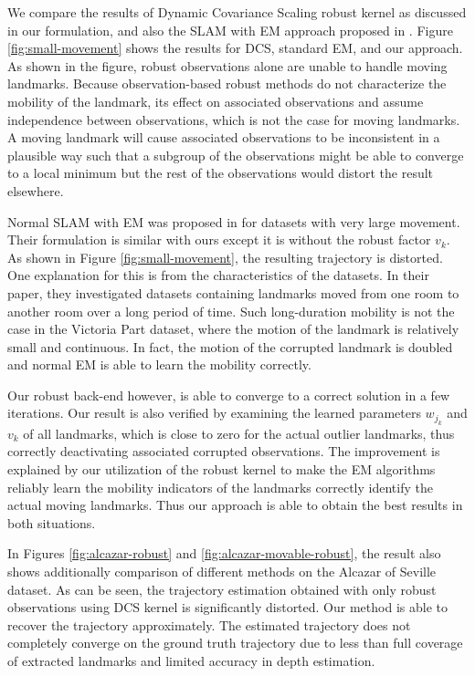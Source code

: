 We compare the results of Dynamic Covariance Scaling robust kernel as discussed in our
formulation, and also the SLAM with EM approach proposed in \cite{rogers2010slam}.  Figure \ref{fig:small-movement} shows the results for DCS, standard EM, and our
approach. As shown in the figure, robust observations alone are unable to
handle moving landmarks. Because observation-based robust methods do
not characterize the mobility of the landmark, its effect on associated
observations and assume independence between observations, which is not the case for moving landmarks. A moving landmark will cause associated observations to
be inconsistent in a plausible way such that a subgroup of the observations
might be able to converge to a local minimum but the rest of the observations
would distort the result elsewhere. 

Normal SLAM with EM was proposed in \cite{rogers2010slam} for datasets with
very large movement. Their formulation is similar with ours except it is
without the robust factor $v_k$.  As shown in Figure \ref{fig:small-movement},
the resulting trajectory is distorted. One explanation for this is from the
characteristics of the datasets.  In their paper, they investigated datasets
containing landmarks moved from one room to another room over a long period of
time.%
Such long-duration mobility is not the case in the Victoria Part dataset, where the motion of the landmark is relatively small and continuous. In fact, %
the motion of the
corrupted landmark is doubled and normal EM is able to learn the mobility
correctly.

Our robust back-end however, is able to converge to a correct solution in a few
iterations. Our result is also verified by examining the learned parameters
$w_{j_k}$ and $v_k$ of all landmarks, which is close to zero for the actual
outlier landmarks, thus correctly deactivating associated corrupted
observations.  The improvement is explained by our utilization of the robust
kernel to make the EM algorithms reliably learn the mobility indicators of the
landmarks correctly identify the actual moving landmarks. Thus our approach is
able to obtain the best results in both situations.

In Figures \ref{fig:alcazar-robust} and \ref{fig:alcazar-movable-robust}, the
result also shows additionally comparison of different methods on the Alcazar of
Seville dataset. As can be seen, the trajectory estimation obtained with only
robust observations using DCS kernel is significantly distorted. Our method is
able to recover the trajectory approximately. The estimated trajectory does not
completely converge on the ground truth trajectory due to less than full
coverage of extracted landmarks and limited accuracy in depth estimation.

